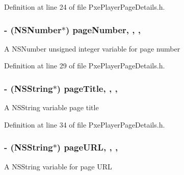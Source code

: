 Definition at line 24 of file Pxe\-Player\-Page\-Details.\-h.

\hypertarget{interface_pxe_player_page_details_a48af8f668bcac26661b2f62913a0d2a1}{
\subsubsection[{page\-Number}]{\setlength{\rightskip}{0pt plus 5cm}-\/ (N\-S\-Number$\ast$) page\-Number\hspace{0.3cm}{\ttfamily [read]}, {\ttfamily [write]}, {\ttfamily [nonatomic]}, {\ttfamily [retain]}}}\label{interface_pxe_player_page_details_a48af8f668bcac26661b2f62913a0d2a1}
A N\-S\-Number unsigned integer variable for page number 

Definition at line 29 of file Pxe\-Player\-Page\-Details.\-h.

\hypertarget{interface_pxe_player_page_details_a6b184fb3390508be1580cb0eb8a5ba40}{
\subsubsection[{page\-Title}]{\setlength{\rightskip}{0pt plus 5cm}-\/ (N\-S\-String$\ast$) page\-Title\hspace{0.3cm}{\ttfamily [read]}, {\ttfamily [write]}, {\ttfamily [nonatomic]}, {\ttfamily [retain]}}}\label{interface_pxe_player_page_details_a6b184fb3390508be1580cb0eb8a5ba40}
A N\-S\-String variable page title 

Definition at line 34 of file Pxe\-Player\-Page\-Details.\-h.

\hypertarget{interface_pxe_player_page_details_ae3b8a467041b75c0f224901ff9b7ab76}{
\subsubsection[{page\-U\-R\-L}]{\setlength{\rightskip}{0pt plus 5cm}-\/ (N\-S\-String$\ast$) page\-U\-R\-L\hspace{0.3cm}{\ttfamily [read]}, {\ttfamily [write]}, {\ttfamily [nonatomic]}, {\ttfamily [retain]}}}\label{interface_pxe_player_page_details_ae3b8a467041b75c0f224901ff9b7ab76}
A N\-S\-String variable for page U\-R\-L 

